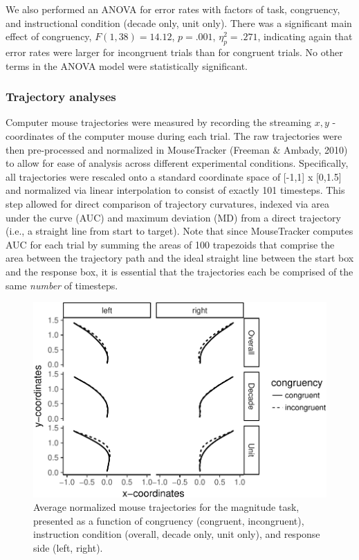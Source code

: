 \documentclass[english,man]{apa6}
\theoremstyle{definition}
\theoremstyle{definition}
\theoremstyle{definition}
\theoremstyle{remark}
\begin{document}
We also performed an ANOVA for error rates with factors of task,
congruency, and instructional condition (decade only, unit only). There
was a significant main effect of congruency, \(F(1, 38) = 14.12\),
\(p = .001\), \(\eta^2_p = .271\), indicating again that error rates
were larger for incongruent trials than for congruent trials. No other
terms in the ANOVA model were statistically significant.

\subsubsection{Trajectory analyses}\label{trajectory-analyses}

Computer mouse trajectories were measured by recording the streaming
\(x, y\) - coordinates of the computer mouse during each trial. The raw
trajectories were then pre-processed and normalized in MouseTracker
(Freeman \& Ambady, 2010) to allow for ease of analysis across different
experimental conditions. Specifically, all trajectories were rescaled
onto a standard coordinate space of {[}-1,1{]} x {[}0,1.5{]} and
normalized via linear interpolation to consist of exactly 101 timesteps.
This step allowed for direct comparison of trajectory curvatures,
indexed via area under the curve (AUC) and maximum deviation (MD) from a
direct trajectory (i.e., a straight line from start to target). Note
that since MouseTracker computes AUC for each trial by summing the areas
of 100 trapezoids that comprise the area between the trajectory path and
the ideal straight line between the start box and the response box, it
is essential that the trajectories each be comprised of the same
\emph{number} of timesteps.

\begin{figure}
\centering
\includegraphics{paper_files/figure-latex/magnitudeTrajectories-1.pdf}
\caption{\label{fig:magnitudeTrajectories}Average normalized mouse
trajectories for the magnitude task, presented as a function of
congruency (congruent, incongruent), instruction condition (overall,
decade only, unit only), and response side (left, right).}
\end{figure}
\end{document}
